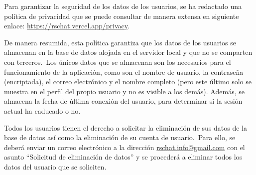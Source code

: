 
Para garantizar la seguridad de los datos de los usuarios, se ha redactado una política de privacidad
que se puede consultar de manera extensa en siguiente enlace:
\href{https://rschat.vercel.app/privacy}{https://rschat.vercel.app/privacy}.

De manera resumida, esta política garantiza que los datos de los usuarios se almacenan en la base de datos alojada en el
servidor local y que no se comparten con terceros.\ Los únicos datos que se almacenan son los necesarios para el
funcionamiento de la aplicación, como son el nombre de usuario, la contraseña (encriptada), el correo electrónico y
el nombre completo (pero este último solo se muestra en el perfil del propio usuario y no es visible a los demás).
Además, se almacena la fecha de última conexión del usuario, para determinar si la sesión actual ha caducado o no.

Todos los usuarios tienen el derecho a solicitar la eliminación de sus datos de la base de datos así como
la eliminación de su cuenta de usuario.\ Para ello, se deberá enviar un correo electrónico a la dirección
\href{mailto:rschat.info@gmail.com}{rschat.info@gmail.com} con el asunto ``Solicitud de eliminación de datos'' y se
procederá a eliminar todos los datos del usuario que se soliciten.
